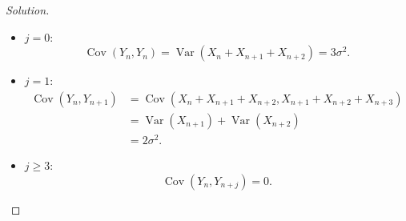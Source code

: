 \documentclass{article}[12pt]
\newenvironment{solution}
  {\renewcommand\qedsymbol{$\blacksquare$}\begin{proof}[Solution]}
  {\end{proof}}
\newenvironment{problem}[1]
  {\renewcommand\theinnercustomprblm{#1}\innercustomprblm}
  {\endinnercustomprblm}
\DeclareMathOperator{\Var}{Var}
\DeclareMathOperator{\Cov}{Cov}
\begin{document}
\begin{problem}{7.39}
\end{problem}
\begin{solution}
\text{}
\begin{itemize}
    \item $j = 0$:
    \begin{equation}
        \Cov(Y_{n}, Y_{n}) = \Var(X_{n} + X_{n+1} + X_{n+2}) = 3\sigma^{2}.
    \end{equation}
    \item $j =1$:
    \begin{align*}
        \Cov(Y_{n}, Y_{n+1}) &= \Cov(X_{n} + X_{n+1} + X_{n+2}, X_{n+1} + X_{n+2} + X_{n+3})
        \\
        &= \Var(X_{n+1}) + \Var(X_{n+2}) 
        \\
        &= 2\sigma^{2}.
    \end{align*}
    \item $j\geqslant 3$:
    \begin{equation*}
        \Cov(Y_{n}, Y_{n+j}) = 0.
    \end{equation*}
    \end{itemize}
\end{solution}
\end{document}
